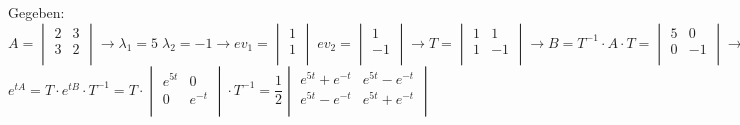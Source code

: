 Gegeben: $A = 	\begin{vmatrix} 
	        		2 & 3\\ 
	        		3 & 2\\   
				\end{vmatrix} \rightarrow
				\lambda_1=5 \; \lambda_2=-1 \rightarrow ev_1=\begin{vmatrix}
					1\\ 
					1\\   
				\end{vmatrix} \;
				ev_2=\begin{vmatrix}
					1\\ 
					-1\\   
				\end{vmatrix} \rightarrow
				T=\begin{vmatrix} 
	        		1 & 1\\ 
	        		1 & -1\\   
				\end{vmatrix} \rightarrow 
				B=T^{-1} \cdot A \cdot T=\begin{vmatrix} 
	        		5 & 0\\ 
	        		0 & -1\\   
				\end{vmatrix} \rightarrow$\\
				\hspace*{4cm}$e^{tA}=T \cdot e^{tB} \cdot T^{-1}=
				T \cdot \begin{vmatrix} 
					e^{5 t} & 0\\ 
					0 & e^{-t}\\   
				\end{vmatrix} \cdot T^{-1} =
				\dfrac{1}{2}\begin{vmatrix} 
					e^{5 t} + e^{-t}& e^{5 t} - e^{-t}\\ 
					e^{5 t} - e^{-t} & e^{5 t} + e^{-t}\\   
				\end{vmatrix}$

